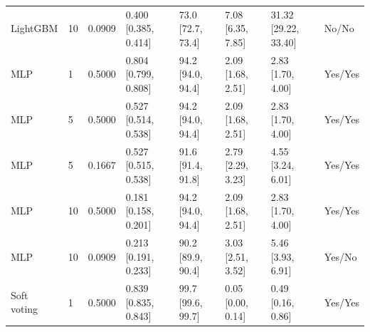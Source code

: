 \begin{longtable}{llllllll}
LightGBM & 10 & 0.0909 & \shortstack{{0.400} \\ {[0.385, 0.414]}} & \shortstack{{73.0} \\ {[72.7, 73.4]}} & \shortstack{{7.08} \\ {[6.35, 7.85]}} & \shortstack{{31.32} \\ {[29.22, 33.40]}} & No/No \\
MLP & 1 & 0.5000 & \shortstack{{0.804} \\ {[0.799, 0.808]}} & \shortstack{{94.2} \\ {[94.0, 94.4]}} & \shortstack{{2.09} \\ {[1.68, 2.51]}} & \shortstack{{2.83} \\ {[1.70, 4.00]}} & Yes/Yes \\
MLP & 5 & 0.5000 & \shortstack{{0.527} \\ {[0.514, 0.538]}} & \shortstack{{94.2} \\ {[94.0, 94.4]}} & \shortstack{{2.09} \\ {[1.68, 2.51]}} & \shortstack{{2.83} \\ {[1.70, 4.00]}} & Yes/Yes \\
MLP & 5 & 0.1667 & \shortstack{{0.527} \\ {[0.515, 0.538]}} & \shortstack{{91.6} \\ {[91.4, 91.8]}} & \shortstack{{2.79} \\ {[2.29, 3.23]}} & \shortstack{{4.55} \\ {[3.24, 6.01]}} & Yes/Yes \\
MLP & 10 & 0.5000 & \shortstack{{0.181} \\ {[0.158, 0.201]}} & \shortstack{{94.2} \\ {[94.0, 94.4]}} & \shortstack{{2.09} \\ {[1.68, 2.51]}} & \shortstack{{2.83} \\ {[1.70, 4.00]}} & Yes/Yes \\
MLP & 10 & 0.0909 & \shortstack{{0.213} \\ {[0.191, 0.233]}} & \shortstack{{90.2} \\ {[89.9, 90.4]}} & \shortstack{{3.03} \\ {[2.51, 3.52]}} & \shortstack{{5.46} \\ {[3.93, 6.91]}} & Yes/No \\
Soft voting & 1 & 0.5000 & \shortstack{{0.839} \\ {[0.835, 0.843]}} & \shortstack{{99.7} \\ {[99.6, 99.7]}} & \shortstack{{0.05} \\ {[0.00, 0.14]}} & \shortstack{{0.49} \\ {[0.16, 0.86]}} & Yes/Yes \\

\end{longtable}
